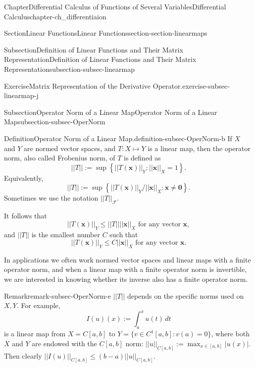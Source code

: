 \documentclass[oneside,10pt,]{book}
\numberwithin{equation}{section}
\newcommand{\cF}{\mathcal{F}}
\begin{document}
\begin{chapterptx}{Chapter}{Differential Calculus of Functions of Several Variables}{}{Differential Calculus}{}{}{chapter-ch_differentiaion}
\begin{sectionptx}{Section}{Linear Functions}{}{Linear Functions}{}{}{section-section-linearmaps}
\begin{subsectionptx}{Subsection}{Definition of  Linear Functions and Their Matrix Representation}{}{Definition of  Linear Functions and Their Matrix Representation}{}{}{subsection-subsec-linearmap}
\begin{inlineexercise}{Exercise}{Matrix Representation of the Derivative Operator.}{exercise-subsec-linearmap-j}
\begin{enumerate}[label=(\alph*)]
\end{enumerate}
\end{inlineexercise}%
\end{subsectionptx}
%
%
\typeout{************************************************}
\typeout{************************************************}
%
\begin{subsectionptx}{Subsection}{Operator Norm of a Linear Map}{}{Operator Norm of a Linear Map}{}{}{subsection-subsec-OperNorm}
\begin{definition}{Definition}{Operator Norm of a Linear Map.}{definition-subsec-OperNorm-b}%
 If \(X\) and \(Y\) are normed vector spaces, and \(T:X\mapsto Y\) is a linear map, then the operator norm, also called Frobenius norm, of \(T\) is defined as%
\begin{equation*}
||T|| :=\sup\left\{ ||T({\mathbf x})||_{Y}: ||{\mathbf x}||_{X} = 1\right\}.
\end{equation*}
Equivalently,%
\begin{equation*}
||T|| :=\sup\left\{ ||T({\mathbf x})||_{Y}/||{\mathbf x}||_{X}: {\mathbf x}\ne {\mathbf 0}\right\}.
\end{equation*}
Sometimes we use the notation \(||T||_{\cF}\).\end{definition}
It follows that%
\begin{equation*}
||T({\mathbf x})||_{Y} \le ||T|| ||{\mathbf x}||_{X} \text{ for any vector } {\mathbf x},
\end{equation*}
and \(||T||\) is the smallest number \(C\) such that%
\begin{equation*}
||T({\mathbf x})||_{Y} \le C ||{\mathbf x}||_{X} \text{ for any vector } {\mathbf x}.
\end{equation*}
%
\par
In applications we often work normed vector spaces and linear maps with a finite operator norm, and when a linear map with a finite operator norm is invertible, we are interested in knowing whether its inverse also has a finite operator norm.%
\begin{remark}{Remark}{}{remark-subsec-OperNorm-e}%
\(||T||\) depends on the specific norms used on \(X, Y\). For example,%
\begin{equation*}
I(u)(x) :=\int_{a}^{x}u(t)\, dt
\end{equation*}
is a linear map from \(X=C[a, b]\) to \(Y=\{v\in C^{1}[a, b]: v(a)=0\}\), where both \(X\) and \(Y\) are endowed with the \(C[a, b]\) norm: \(||u||_{C[a, b]} :=\max_{x\in [a, b]} |u(x)|\). Then clearly \(||I(u)||_{C[a, b]} \le (b-a) ||u||_{C[a, b]}\).%

\end{remark}
\end{subsectionptx}
\end{sectionptx}
\end{chapterptx}
\end{document}
